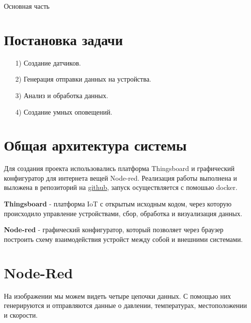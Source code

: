\begin{chapter}{Основная часть}

\section{Постановка задачи}
	\begin{enumerate} 
      \item[1)]  Создание датчиков.
      \item[2)]  Генерация отправки данных на устройства.
      \item[3)] Анализ и обработка данных.
      \item[4)] Создание умных оповещений.
    \end{enumerate}

\section{Общая архитектура системы}

    Для создания проекта использовались платформа Thingsboard и графический конфигуратор для интернета вещей Node-red. Реализация работы выполнена и выложена в репозиторий на  \href{https://github.com/alexeyhorkin/IoT_UNN_HW}{github}, запуск осуществляется с  помошью docker.
    
    \textbf{Thingsboard} - платформа IoT с открытым исходным кодом, через которую происходило управление устройствами, сбор, обработка и визуализация данных.
    
    \textbf{Node-red} - графический конфигуратор, который позволяет через браузер построить схему взаимодействия устройст между собой и внешними системами.
    
\section{Node-Red}

    На изображении мы можем видеть четыре цепочки данных. С помощью них генерируются и отправляются данные о давлении, температурах, местоположении и скорости.
    

\end{chapter}
